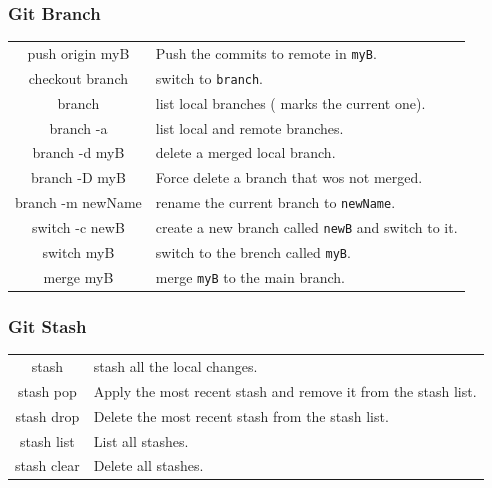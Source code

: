 \documentclass[10pt]{article}
\begin{document}
\begin{multicols}{2}
\subsubsection{Git Branch}
\begin{tabular}{C L}
push origin myB   & Push the commits to remote in \texttt{myB}. \\
checkout branch   & switch to \texttt{branch}.\\
branch            & list local branches (\* marks the current one).\\
branch -a         & list local and remote branches.\\
branch -d myB     & delete a merged local branch.\\
branch -D myB     & Force delete a branch that wos not merged.\\
branch -m newName & rename the current branch to \texttt{newName}.\\
switch -c newB    & create a new branch called \texttt{newB} and switch to it.\\
switch myB        & switch to the brench called \texttt{myB}.\\
merge myB         & merge \texttt{myB} to the main branch.\\
\end{tabular}

\subsubsection{Git Stash}
\begin{tabular}{C L}
  stash       & stash all the local changes.\\
  stash pop   & Apply the most recent stash and remove it from the stash list.\\
  stash drop  & Delete the most recent stash from the stash list.\\
  stash list  & List all stashes.\\
  stash clear & Delete all stashes.\\
\end{tabular}


\end{multicols}
\end{document}
